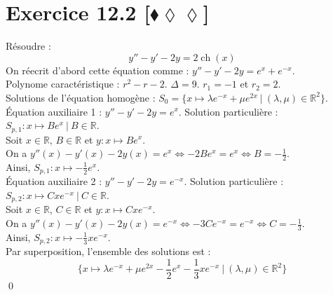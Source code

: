 \documentclass[10pt]{article}
\DeclareMathOperator{\ch}{ch}
\begin{document}
\section*{Exercice 12.2 [$\blacklozenge\lozenge\lozenge$]}
\begin{tcolorbox}[enhanced, width=7.5in, center, size=fbox, fontupper=\large, drop shadow southwest]
    Résoudre :
    \begin{equation*}
        y'' - y' - 2y = 2\ch(x)
    \end{equation*}
    On réecrit d'abord cette équation comme : $y'' - y' - 2y = e^{x} + e^{-x}$.\\
    Polynome caractéristique : $r^2 - r - 2$. $\Delta = 9$. $r_1 = -1$ et $r_2 = 2$.\\
    Solutions de l'équation homogène : $S_0 = \{x \mapsto \lambda e^{-x} + \mu e^{2x} ~ | ~ (\lambda, \mu) \in \mathbb{R}^2\}$.\\
    Équation auxiliaire 1 : $y'' - y' - 2y = e^x$. Solution particulière : $S_{p,1} : x\mapsto Be^{x} ~ | ~ B\in\mathbb{R}$.\\
    Soit $x\in\mathbb{R}$, $B\in\mathbb{R}$ et $y:x\mapsto Be^x$.\\
    On a $y''(x) - y'(x) - 2y(x) = e^x \iff -2Be^x = e^x \iff B = -\frac{1}{2}$.\\
    Ainsi, $S_{p,1}:x\mapsto -\frac{1}{2}e^x$.\\
    Équation auxiliaire 2 : $y'' - y' - 2y = e^{-x}$. Solution particulière : $S_{p,2} : x\mapsto Cxe^{-x} ~ | ~ C\in\mathbb{R}$.\\
    Soit $x\in\mathbb{R}$, $C\in\mathbb{R}$ et $y:x\mapsto Cxe^{-x}$.\\
    On a $y''(x) - y'(x) - 2y(x) = e^{-x} \iff -3Ce^{-x} = e^{-x} \iff C = -\frac{1}{3}$.\\
    Ainsi, $S_{p,2}: x\mapsto -\frac{1}{3}xe^{-x}$.\\
    Par superposition, l'ensemble des solutions est :
    \begin{equation*}
        \{x\mapsto \lambda e^{-x} + \mu e^{2x} - \frac{1}{2}e^x - \frac{1}{3}xe^{-x} ~ | ~ (\lambda, \mu)\in\mathbb{R}^2\}
    \end{equation*}
    \qed
\end{tcolorbox}
\end{document}
